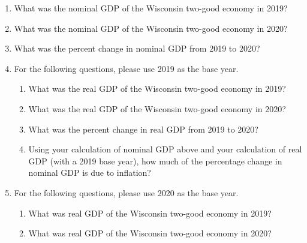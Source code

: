 \documentclass{assignment}
\begin{document}
\begin{enumerate}

\item What was the nominal GDP of the Wisconsin two-good economy in 2019?

\vfill

\item What was the nominal GDP of the Wisconsin two-good economy in 2020?

\vfill

\item What was the percent change in nominal GDP from 2019 to 2020?

\vfill

\vspace{-2\baselineskip}
\clearpage

\item For the following questions, please use 2019 as the base year.

\begin{enumerate}

\item What was the real GDP of the Wisconsin two-good economy in 2019?

\vfill

\item What was the real GDP of the Wisconsin two-good economy in 2020?

\vfill

\item What was the percent change in real GDP from 2019 to 2020?

\vfill

\item Using your calculation of nominal GDP above and your calculation of real GDP (with a 2019 base year), how much of the percentage change in nominal GDP is due to inflation?

\vfill

\end{enumerate}

\item For the following questions, please use 2020 as the base year.

\begin{enumerate}

\item What was real GDP of the Wisconsin two-good economy in 2019?

\vfill

\item What was real GDP of the Wisconsin two-good economy in 2020?


\end{enumerate}
\end{enumerate}
\end{document}
